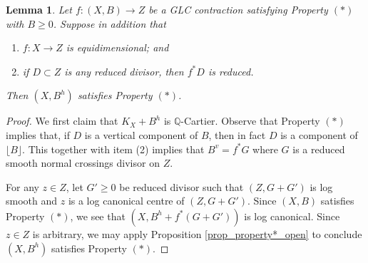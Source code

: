 \documentclass[12pt]{amsart}
\theoremstyle{plain}
\newtheorem{lemma}[theorem]{Lemma}
\theoremstyle{definition}
\begin{document}
\begin{lemma}
\label{lem_horz_has_*}
Let $f\colon (X, B) \rightarrow Z$ be a GLC contraction satisfying Property $(*)$ with $B \geq 0$.
Suppose in addition that 
\begin{enumerate}
\item $f\colon X \rightarrow Z$ is equidimensional; and 
\item if $D \subset Z$ is any reduced divisor, then $f^*D$ is reduced.
\end{enumerate} 
Then $(X, B^h)$ satisfies Property $(*)$.
\end{lemma}
\begin{proof}
We first claim that $K_X+B^h$ is $\mathbb Q$-Cartier.  Observe that Property $(*)$ implies that, if $D$ is a vertical component of $B$, then in fact $D$ is a component of $\lfloor B\rfloor$.
This together with item (2) implies that $B^v = f^*G$ where $G$ is a reduced smooth normal crossings divisor on $Z$.

For any $z \in Z$, let $G' \geq 0$ be reduced divisor such that $(Z, G+G')$ 
is log smooth and $z$ 
is a log canonical centre of $(Z, G+G')$.
Since $(X, B)$ satisfies Property $(*)$, we see that
$(X, B^h+f^*(G+G'))$ is log canonical.
Since $z \in Z$ is arbitrary, we may apply Proposition \ref{prop_property*_open} to conclude $(X, B^h)$ satisfies Property $(*)$.
\end{proof}
\end{document}
